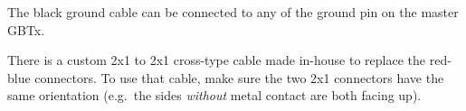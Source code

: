 \begin{leftbar}
    The black ground cable can be connected to any of the ground pin on the
    master GBTx.
\end{leftbar}

\begin{leftbar}
    There is a custom 2x1 to 2x1 cross-type cable made in-house to replace the
    red-blue connectors.
    To use that cable, make sure the two 2x1 connectors have the same
    orientation (e.g.\ the sides \emph{without} metal contact are both facing
    up).
\end{leftbar}
